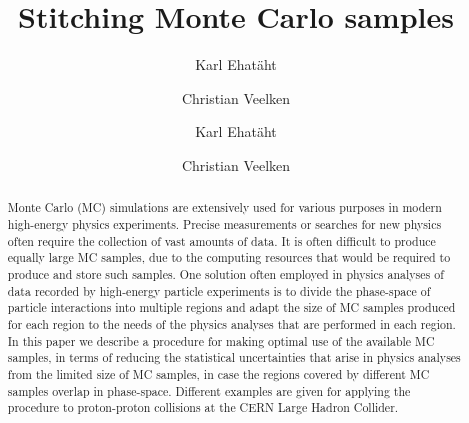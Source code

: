 \documentclass[a4paper,english,11pt]{article}
\begin{document}
\ifx\ver\verPAPER
\begin{frontmatter}
\fi

\title{Stitching Monte Carlo samples}


\ifx\ver\verPreprint
\author[1]{Karl Ehat\"aht}
\author[1]{Christian Veelken}
\fi
\ifx\ver\verPAPER
\author[tallinn]{Karl Ehat\"aht}
\author[tallinn]{Christian Veelken}
\address[tallinn]{National Institute for Chemical Physics and Biophysics, 10143 Tallinn, Estonia}
\fi

\ifx\ver\verPreprint
\maketitle
\fi

\begin{abstract}
Monte Carlo (MC) simulations are extensively used for various purposes in modern high-energy physics experiments.
Precise measurements or searches for new physics often require the collection of vast amounts of data.
It is often difficult to produce equally large MC samples, due to the computing resources that would be required to produce and store such samples.
One solution often employed in physics analyses of data recorded by high-energy particle experiments 
is to divide the phase-space of particle interactions into multiple regions 
and adapt the size of MC samples produced for each region to the needs of the physics analyses that are performed in each region.
In this paper we describe a procedure for making optimal use of the available MC samples, 
in terms of reducing the statistical uncertainties that arise in physics analyses from the limited size of MC samples,
in case the regions covered by different MC samples overlap in phase-space.
Different examples are given for applying the procedure to proton-proton collisions at the CERN Large Hadron Collider.
\end{abstract}

\ifx\ver\verPAPER
\end{frontmatter}
\fi

\clearpage








\end{document}
